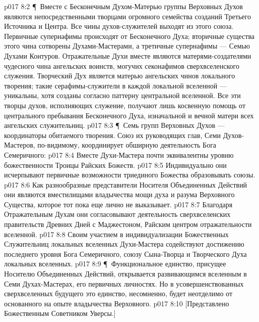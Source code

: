 \vs p017 8:2 \P\ Вместе с Бесконечным Духом\hyp{}Матерью группы Верховных Духов являются непосредственными творцами огромного семейства созданий Третьего Источника и Центра. Все чины духов\hyp{}служителей выходят из этого союза. Первичные супернафимы происходят от Бесконечного Духа; вторичные существа этого чина сотворены Духами\hyp{}Мастерами, а третичные супернафимы --- Семью Духами Контуров. Отражательные Духи вместе являются матерями\hyp{}создателями чудесного чина ангельских воинств, могучих секонафимов сверхвселенского служения. Творческий Дух является матерью ангельских чинов локального творения; такие серафимы\hyp{}служители в каждой локальной вселенной --- уникальны, хотя созданы согласно паттерну центральной вселенной. Все эти творцы духов, исполняющих служение, получают лишь косвенную помощь от центрального пребывания Бесконечного Духа, изначальной и вечной матери всех ангельских служительниц.
\vs p017 8:3 \P\ Семь групп Верховных Духов --- координаторы обитаемого творения. Союз их руководящих глав, Семи Духов\hyp{}Мастеров, по\hyp{}видимому, координирует обширную деятельность Бога Семеричного:
\vs p017 8:4 \bibnobreakspace Вместе Духи\hyp{}Мастера почти эквивалентны уровню божественности Троицы Райских Божеств.
\vs p017 8:5 \bibnobreakspace Индивидуально они исчерпывают первичные возможности триединого Божества образовывать союзы.
\vs p017 8:6 \bibnobreakspace Как разнообразные представители Носителя Объединенных Действий они являются вместилищами владычества мощи духа и разума Верховного Существа, которое тот пока еще лично не выказывает.
\vs p017 8:7 \bibnobreakspace Благодаря Отражательным Духам они согласовывают деятельность сверхвселенских правительств Древних Дней с Маджестоном, Райским центром отражательности вселенной.
\vs p017 8:8 \bibnobreakspace Своим участием в индивидуализации Божественных Служительниц локальных вселенных Духи\hyp{}Мастера содействуют достижению последнего уровня Бога Семеричного, союзу Сына\hyp{}Творца и Творческого Духа локальных вселенных.
\vs p017 8:9 \P\ Функциональное единство, присущее Носителю Объединенных Действий, открывается развивающимся вселенным в Семи Духах\hyp{}Мастерах, его первичных личностях. Но в усовершенствованных сверхвселенных будущего это единство, несомненно, будет неотделимо от основанного на опыте владычества Верховного.
\vs p017 8:10 [Представлено Божественным Советником Уверсы.]
